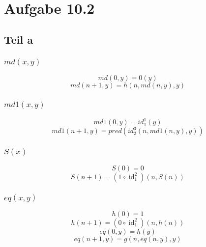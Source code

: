 \documentclass[10pt,a4paper]{article}
\DeclareMathOperator{\id}{id}
\begin{document}
\section{Aufgabe 10.2}

\subsection{Teil a}

\subsubsection{$md(x, y)$}

\begin{equation}
  md(0, y) = 0(y)
\end{equation}
\begin{equation}
  md(n + 1, y) = h(n, md(n, y), y)
\end{equation}

\subsubsection{$md1(x, y)$}

\begin{equation}
  md1(0, y) = id_{1}^{1}(y)
\end{equation}
\begin{equation}
  md1(n + 1, y) = pred(id_{2}^{3}(n, md1(n, y), y))
\end{equation}

\subsubsection{$S(x)$}

\begin{equation}
  S(0) = 0
\end{equation}
\begin{equation}
  S(n + 1) = (1 \circ \id_{1}^{2})(n, S(n))
\end{equation}

\subsubsection{$eq(x, y)$}

\begin{equation}
  h(0) = 1
\end{equation}
\begin{equation}
  h(n + 1) = (0 \circ \id_{1}^{2})(n, h(n))
\end{equation}
\begin{equation}
  eq(0, y) = h(y)
\end{equation}
\begin{equation}
  eq(n + 1, y) = g(n, eq(n, y), y)
\end{equation}
\end{document}
